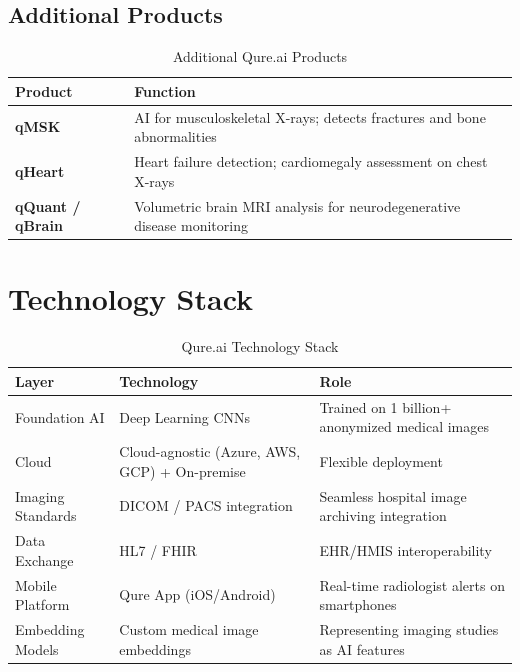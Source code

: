 \documentclass[12pt,a4paper]{article}
\begin{document}
\subsection{Additional Products}
\begin{table}[H]\centering\renewcommand{\arraystretch}{1.3}
\begin{tabularx}{\textwidth}{lX}\toprule
\textbf{Product} & \textbf{Function}\\\midrule
\textbf{qMSK}   & AI for musculoskeletal X-rays; detects fractures and bone abnormalities \\
\textbf{qHeart} & Heart failure detection; cardiomegaly assessment on chest X-rays \\
\textbf{qQuant / qBrain} & Volumetric brain MRI analysis for neurodegenerative disease monitoring \\
\bottomrule\end{tabularx}\caption{Additional Qure.ai Products}\end{table}

\section{Technology Stack}

\begin{table}[H]\centering\renewcommand{\arraystretch}{1.4}
\begin{tabularx}{\textwidth}{llX}\toprule
\textbf{Layer} & \textbf{Technology} & \textbf{Role}\\\midrule
Foundation AI      & Deep Learning CNNs         & Trained on 1 billion+ anonymized medical images \\
Cloud              & Cloud-agnostic (Azure, AWS, GCP) + On-premise & Flexible deployment \\
Imaging Standards  & DICOM / PACS integration   & Seamless hospital image archiving integration \\
Data Exchange      & HL7 / FHIR                 & EHR/HMIS interoperability \\
Mobile Platform    & Qure App (iOS/Android)     & Real-time radiologist alerts on smartphones \\
Embedding Models   & Custom medical image embeddings & Representing imaging studies as AI features \\
\bottomrule\end{tabularx}\caption{Qure.ai Technology Stack}\end{table}
\end{document}
